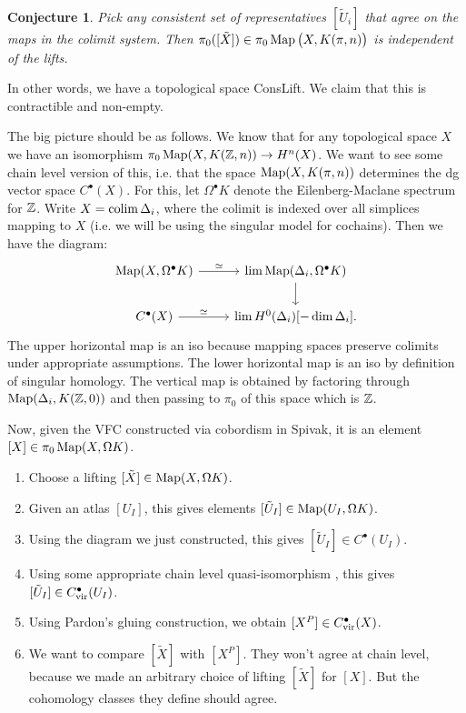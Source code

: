 \documentclass[10pt,a4paper,reqno,oneside]{book} %
\theoremstyle{plain}
\newtheorem{conj}[thm]{Conjecture}
\theoremstyle{definition}
\theoremstyle{remark}
\numberwithin{equation}{section}
\begin{document}
\begin{conj}
Pick any consistent set of representatives $[\tilde U_i]$ that agree on the maps in the colimit system. Then
$\pi_0([\tilde X]) \in \pi_0 \operatorname{Map}\big(X,K(\pi,n)\big)$ is independent of the lifts.
\end{conj}

In other words, we have a topological space ConsLift. We claim that this is contractible and non-empty.



The big picture should be as follows. We know that for any topological space $X$ we have an isomorphism 
$\pi_0 \operatorname{Map} (X,K(\mathbb Z,n)) \to H^n(X)$. We want to see some chain level version of this, i.e. that the space
$\operatorname{Map} (X,K(\pi,n))$ determines the dg vector space $C^{\bullet}(X)$. For this, let $\Omega^{\bullet}K$ denote the
Eilenberg-Maclane spectrum for $\mathbb Z$. Write $X = \operatorname*{colim} \Delta_i$, where the colimit is indexed over all simplices mapping to $X$
(i.e. we will be using the singular model for cochains). Then we have the diagram:
\[
\begin{tikzcd}
\Map (X, \Omega^{\bullet}K) \arrow{r}{\simeq} & \lim \Map(\Delta_i, \Omega^{\bullet} K) \arrow{d} \\
C^{\bullet}(X) \arrow{r}{\simeq} & \lim H^0(\Delta_i)[-\dim \Delta_i] .
\end{tikzcd}
\]
The upper horizontal map is an iso because mapping spaces preserve colimits under appropriate assumptions. 
The lower horizontal map is an iso by definition of singular homology. The vertical map is obtained by factoring through
$\operatorname{Map}(\Delta_i, K(\mathbb Z, 0))$ and then passing to $\pi_0$ of this space which is $\mathbb Z$.

Now, given the VFC constructed via cobordism in Spivak, it is an element $[X] \in \pi_0 \operatorname{Map} (X,\Omega K)$.
\begin{enumerate}
\item Choose a lifting $[\tilde X] \in \operatorname{Map}(X,\Omega K)$.
\item Given an atlas $[U_I]$, this gives elements $[\tilde U_I] \in \operatorname{Map}(U_I,\Omega K)$.
\item Using the diagram we just constructed, this gives $[\tilde U_I] \in C^{\bullet}(U_I)$.
\item Using some appropriate chain level quasi-isomorphism , this gives $[\tilde U_I] \in C^{\bullet}_{\operatorname{vir}}(U_I)$.
\item Using Pardon's gluing construction, we obtain $[X^P] \in C_{\operatorname{vir}}^{\bullet}(X)$.
\item We want to compare $[\tilde X]$ with $[X^P]$. They won't agree at chain level, because we made an arbitrary choice
of lifting $[\tilde X]$ for $[X]$.  But the cohomology classes they define should agree.
\end{enumerate}
\end{document}
